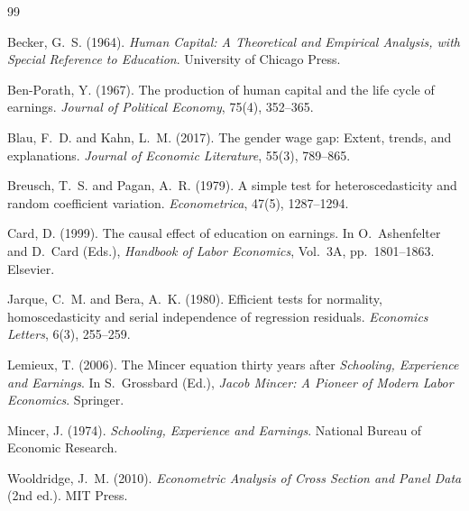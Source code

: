 \documentclass[12pt, a4paper]{article}
\begin{document}
\begin{thebibliography}{99}

Becker, G.~S. (1964).
\newblock \textit{Human Capital: A Theoretical and Empirical Analysis, with
  Special Reference to Education}.
\newblock University of Chicago Press.

Ben-Porath, Y. (1967).
\newblock The production of human capital and the life cycle of earnings.
\newblock \textit{Journal of Political Economy}, 75(4), 352--365.

Blau, F.~D. and Kahn, L.~M. (2017).
\newblock The gender wage gap: Extent, trends, and explanations.
\newblock \textit{Journal of Economic Literature}, 55(3), 789--865.

Breusch, T.~S. and Pagan, A.~R. (1979).
\newblock A simple test for heteroscedasticity and random coefficient variation.
\newblock \textit{Econometrica}, 47(5), 1287--1294.

Card, D. (1999).
\newblock The causal effect of education on earnings.
\newblock In O.~Ashenfelter and D.~Card (Eds.), \textit{Handbook of Labor
  Economics}, Vol.~3A, pp.\ 1801--1863. Elsevier.

Jarque, C.~M. and Bera, A.~K. (1980).
\newblock Efficient tests for normality, homoscedasticity and serial independence of regression residuals.
\newblock \textit{Economics Letters}, 6(3), 255--259.

Lemieux, T. (2006).
\newblock The Mincer equation thirty years after \textit{Schooling, Experience
  and Earnings}.
\newblock In S.~Grossbard (Ed.), \textit{Jacob Mincer: A Pioneer of Modern
  Labor Economics}. Springer.

Mincer, J. (1974).
\newblock \textit{Schooling, Experience and Earnings}.
\newblock National Bureau of Economic Research.

Wooldridge, J.~M. (2010).
\newblock \textit{Econometric Analysis of Cross Section and Panel Data} (2nd
  ed.).
\newblock MIT Press.

\end{thebibliography}

\newpage
\appendix
\end{document}
